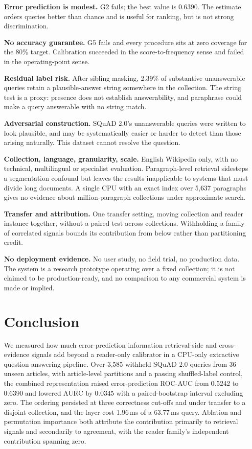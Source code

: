 \documentclass[conference]{IEEEtran}
\begin{document}
\textbf{Error prediction is modest.} G2 fails; the best value is 0.6390. The estimate
orders queries better than chance and is useful for ranking, but is not strong
discrimination.

\textbf{No accuracy guarantee.} G5 fails and every procedure sits at zero coverage
for the 80\% target. Calibration succeeded in the score-to-frequency sense and
failed in the operating-point sense.

\textbf{Residual label risk.} After sibling masking, 2.39\% of substantive
unanswerable queries retain a plausible-answer string somewhere in the collection.
The string test is a proxy: presence does not establish answerability, and
paraphrase could make a query answerable with no string match.

\textbf{Adversarial construction.} SQuAD 2.0's unanswerable queries were written to
look plausible, and may be systematically easier or harder to detect than those
arising naturally. This dataset cannot resolve the question.

\textbf{Collection, language, granularity, scale.} English Wikipedia only, with no
technical, multilingual or specialist evaluation. Paragraph-level retrieval sidesteps
a segmentation confound but leaves the results inapplicable to systems that must
divide long documents. A single CPU with an exact index over 5{,}637 paragraphs
gives no evidence about million-paragraph collections under approximate search.

\textbf{Transfer and attribution.} One transfer setting, moving collection and reader
instance together, without a paired test across collections. Withholding a family of
correlated signals bounds its contribution from below rather than partitioning credit.

\textbf{No deployment evidence.} No user study, no field trial, no production data.
The system is a research prototype operating over a fixed collection; it is not
claimed to be production-ready, and no comparison to any commercial system is made
or implied.

\section{Conclusion}
We measured how much error-prediction information retrieval-side and cross-evidence
signals add beyond a reader-only calibrator in a CPU-only extractive
question-answering pipeline. Over 3{,}585 withheld SQuAD 2.0 queries from 36 unseen
articles, with article-level partitions and a passing shuffled-label control, the
combined representation raised error-prediction ROC-AUC from 0.5242 to 0.6390 and
lowered AURC by 0.0345 with a paired-bootstrap interval excluding zero. The ordering
persisted at three correctness cut-offs and under transfer to a disjoint collection,
and the layer cost 1.96\,ms of a 63.77\,ms query. Ablation and permutation importance
both attribute the contribution primarily to retrieval signals and secondarily to
agreement, with the reader family's independent contribution spanning zero.
\end{document}
